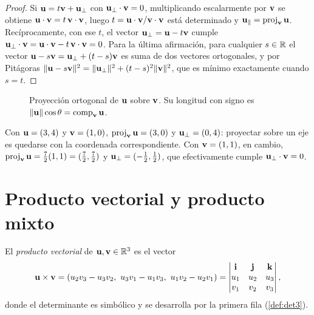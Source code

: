 \begin{proof}
Si $\mathbf{u}=t\mathbf{v}+\mathbf{u}_\perp$ con $\mathbf{u}_\perp\cdot\mathbf{v}=0$, multiplicando escalarmente por $\mathbf{v}$ se obtiene $\mathbf{u}\cdot\mathbf{v}=t\,\mathbf{v}\cdot\mathbf{v}$, luego $t=\mathbf{u}\cdot\mathbf{v}/\mathbf{v}\cdot\mathbf{v}$ está determinado y $\mathbf{u}_\parallel=\operatorname{proj}_{\mathbf{v}}\mathbf{u}$. Recíprocamente, con ese $t$, el vector $\mathbf{u}_\perp=\mathbf{u}-t\mathbf{v}$ cumple $\mathbf{u}_\perp\cdot\mathbf{v}=\mathbf{u}\cdot\mathbf{v}-t\,\mathbf{v}\cdot\mathbf{v}=0$. Para la última afirmación, para cualquier $s\in\mathbb{R}$ el vector $\mathbf{u}-s\mathbf{v}=\mathbf{u}_\perp+(t-s)\mathbf{v}$ es suma de dos vectores ortogonales, y por Pitágoras $\lVert\mathbf{u}-s\mathbf{v}\rVert^2=\lVert\mathbf{u}_\perp\rVert^2+(t-s)^2\lVert\mathbf{v}\rVert^2$, que es mínimo exactamente cuando $s=t$.
\end{proof}

\begin{figure}[ht]
\centering
{}
\caption{Proyección ortogonal de $\mathbf{u}$ sobre $\mathbf{v}$. Su longitud con signo es $\lVert\mathbf{u}\rVert\cos\theta=\operatorname{comp}_{\mathbf{v}}\mathbf{u}$.}
\label{fig:t1-proyeccion}
\end{figure}

\begin{ejemplo}\label{ej:t1-proyeccion}
Con $\mathbf{u}=(3,4)$ y $\mathbf{v}=(1,0)$, $\operatorname{proj}_{\mathbf{v}}\mathbf{u}=(3,0)$ y $\mathbf{u}_\perp=(0,4)$: proyectar sobre un eje es quedarse con la coordenada correspondiente. Con $\mathbf{v}=(1,1)$, en cambio, $\operatorname{proj}_{\mathbf{v}}\mathbf{u}=\tfrac{7}{2}(1,1)=(\tfrac72,\tfrac72)$ y $\mathbf{u}_\perp=(-\tfrac12,\tfrac12)$, que efectivamente cumple $\mathbf{u}_\perp\cdot\mathbf{v}=0$.
\end{ejemplo}

\section{Producto vectorial y producto mixto}

\begin{definicion}\label{def:vectorial}
El \emph{producto vectorial} de $\mathbf{u},\mathbf{v}\in\mathbb{R}^3$ es el vector
\[
\vu\times\vv=(u_2v_3-u_3v_2,\ u_3v_1-u_1v_3,\ u_1v_2-u_2v_1)
=\begin{vmatrix}\vi&\vj&\vk\\u_1&u_2&u_3\\v_1&v_2&v_3\end{vmatrix},
\]
donde el determinante es simbólico y se desarrolla por la primera fila (\cref{def:det3}).
\end{definicion}

